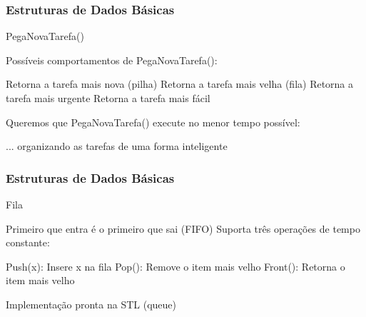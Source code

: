 \begin{frame}
\frametitle{Estruturas de Dados Básicas}
\begin{block}{PegaNovaTarefa()}
\begin{itemize}
	\bitem Possíveis comportamentos de PegaNovaTarefa():
	\begin{itemize}
		\bitem Retorna a tarefa mais nova (pilha)
		\bitem Retorna a tarefa mais velha (fila)
		\bitem Retorna a tarefa mais urgente
		\bitem Retorna a tarefa mais fácil
	\end{itemize}
	\bitem Queremos que PegaNovaTarefa() execute no menor tempo possível:
	\begin{itemize}
		\bitem ... organizando as tarefas de uma forma inteligente
	\end{itemize}
\end{itemize}
\end{block}
\end{frame}

\begin{frame}
\frametitle{Estruturas de Dados Básicas}
\begin{block}{Fila}
\begin{itemize}
	\bitem Primeiro que entra é o primeiro que sai (FIFO)
	\bitem Suporta três operações de tempo constante:
	\begin{itemize}
		\bitem Push(x): Insere x na fila
		\bitem Pop(): Remove o item mais velho
		\bitem Front(): Retorna o item mais velho
	\end{itemize}
	\bitem Implementação pronta na STL (queue)
\end{itemize}
\end{block}
\end{frame}

